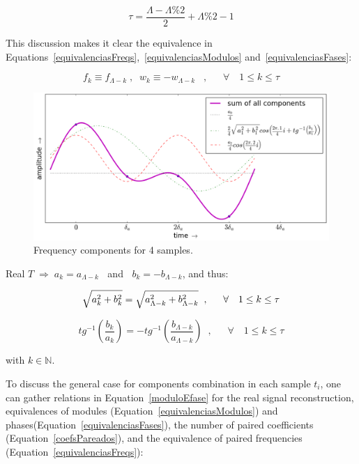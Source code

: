 \begin{equation}\label{coefsPareados}
\tau = \frac{\Lambda - \Lambda \% 2}{2} +\Lambda \% 2 -1
\end{equation}

This discussion makes it clear the equivalence in Equations~\ref{equivalenciasFreqs},~\ref{equivalenciasModulos} and~\ref{equivalenciasFases}:

\begin{equation}\label{equivalenciasFreqs}
f_{k}\equiv f_{\Lambda-k}\;, \;\; w_{k}\equiv-w_{\Lambda-k}\;\;\;, \quad \;\; \forall \quad 1 \leq k \leq \tau  
\end{equation}

\begin{figure}
    \centering
        \includegraphics[width=.7\textwidth]{figures/amostras4____}
    \caption{Frequency components for 4 samples.}
        \label{fig:amostras4}
\end{figure}

Real $T \; \Rightarrow \; a_k = a_{\Lambda -k}\;\;$ and $\;\;b_k = - b_{\Lambda -k}$, and thus:

\begin{equation}\label{equivalenciasModulos}
\sqrt{a_k^2 + b_k^2} = \sqrt{a_{\Lambda - k}^2 + b_{\Lambda -k}^2} \;\;, \quad \;\; \forall \quad 1 \leq k \leq \tau  \\
\end{equation}

\begin{equation}\label{equivalenciasFases}
tg^{-1}\left(\frac{b_k}{a_k}\right)=-tg^{-1}\left(\frac{b_{\Lambda -k}}{a_{\Lambda - k}}\right)\;\;,\quad \;\; \forall \quad 1 \leq k \leq \tau
\end{equation}

\noindent with $k \in \mathbb{N}$.

To discuss the general case for components combination in each sample $t_i$, one can gather relations in Equation~\ref{moduloEfase} for the real signal reconstruction, equivalences of modules (Equation~\ref{equivalenciasModulos}) and phases(Equation~\ref{equivalenciasFases}), the number of paired coefficients (Equation~\ref{coefsPareados}), and the equivalence of paired frequencies (Equation~\ref{equivalenciasFreqs}):

